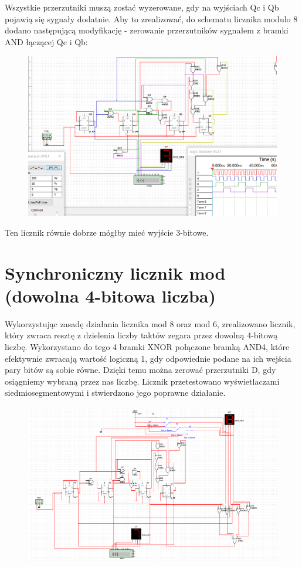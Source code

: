 \documentclass[12pt,a4paper]{article}
\begin{document}
Wszystkie przerzutniki muszą zostać wyzerowane, gdy na wyjściach Qc i Qb pojawią się sygnały dodatnie. Aby to zrealizować, do schematu licznika modulo 8 dodano następującą modyfikację - zerowanie przerzutników sygnałem z bramki AND łączącej Qc i Qb:

\begin{figure}[H]
\centering
\includegraphics[width=\textwidth]{img/4d_4bit_mod6}
\end{figure}

Ten licznik równie dobrze mógłby mieć wyjście 3-bitowe.

\section{Synchroniczny licznik mod (dowolna 4-bitowa liczba)}

Wykorzystując zasadę działania licznika mod 8 oraz mod 6, zrealizowano licznik, który zwraca resztę z dzielenia liczby taktów zegara przez dowolną 4-bitową liczbę. Wykorzystano do tego 4 bramki XNOR połączone bramką AND4, które efektywnie zwracają wartość logiczną 1, gdy odpowiednie podane na ich wejścia pary bitów są sobie równe. Dzięki temu można zerować przerzutniki D, gdy osiągniemy wybraną przez nas liczbę. Licznik przetestowano wyświetlaczami siedmiosegmentowymi i stwierdzono jego poprawne działanie. 

\begin{figure}[H]
\centering
\includegraphics[width=\textwidth]{img/4extra_4bit}
\end{figure}
\end{document}
